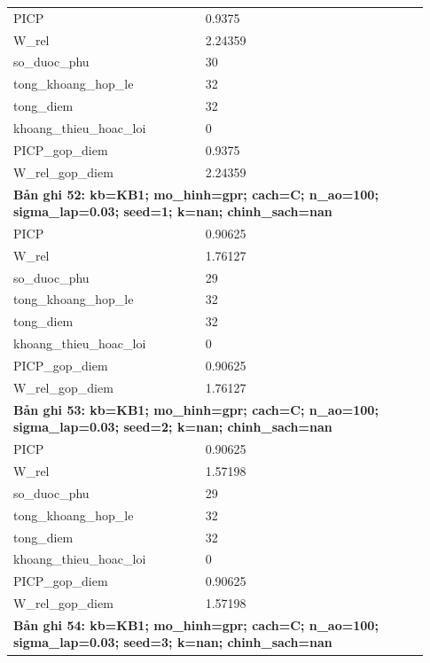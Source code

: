 \begin{longtable}{p{0.43\linewidth}p{0.50\linewidth}}
PICP & 0.9375 \\
W\_\allowbreak rel & 2.24359 \\
so\_\allowbreak duoc\_\allowbreak phu & 30 \\
tong\_\allowbreak khoang\_\allowbreak hop\_\allowbreak le & 32 \\
tong\_\allowbreak diem & 32 \\
khoang\_\allowbreak thieu\_\allowbreak hoac\_\allowbreak loi & 0 \\
PICP\_\allowbreak gop\_\allowbreak diem & 0.9375 \\
W\_\allowbreak rel\_\allowbreak gop\_\allowbreak diem & 2.24359 \\
\midrule
\multicolumn{2}{p{0.95\linewidth}}{\textbf{Bản ghi 52: kb=KB1; mo\_hinh=gpr; cach=C; n\_ao=100; sigma\_lap=0.03; seed=1; k=nan; chinh\_sach=nan}} \\
PICP & 0.90625 \\
W\_\allowbreak rel & 1.76127 \\
so\_\allowbreak duoc\_\allowbreak phu & 29 \\
tong\_\allowbreak khoang\_\allowbreak hop\_\allowbreak le & 32 \\
tong\_\allowbreak diem & 32 \\
khoang\_\allowbreak thieu\_\allowbreak hoac\_\allowbreak loi & 0 \\
PICP\_\allowbreak gop\_\allowbreak diem & 0.90625 \\
W\_\allowbreak rel\_\allowbreak gop\_\allowbreak diem & 1.76127 \\
\midrule
\multicolumn{2}{p{0.95\linewidth}}{\textbf{Bản ghi 53: kb=KB1; mo\_hinh=gpr; cach=C; n\_ao=100; sigma\_lap=0.03; seed=2; k=nan; chinh\_sach=nan}} \\
PICP & 0.90625 \\
W\_\allowbreak rel & 1.57198 \\
so\_\allowbreak duoc\_\allowbreak phu & 29 \\
tong\_\allowbreak khoang\_\allowbreak hop\_\allowbreak le & 32 \\
tong\_\allowbreak diem & 32 \\
khoang\_\allowbreak thieu\_\allowbreak hoac\_\allowbreak loi & 0 \\
PICP\_\allowbreak gop\_\allowbreak diem & 0.90625 \\
W\_\allowbreak rel\_\allowbreak gop\_\allowbreak diem & 1.57198 \\
\midrule
\multicolumn{2}{p{0.95\linewidth}}{\textbf{Bản ghi 54: kb=KB1; mo\_hinh=gpr; cach=C; n\_ao=100; sigma\_lap=0.03; seed=3; k=nan; chinh\_sach=nan}} \\

\end{longtable}
